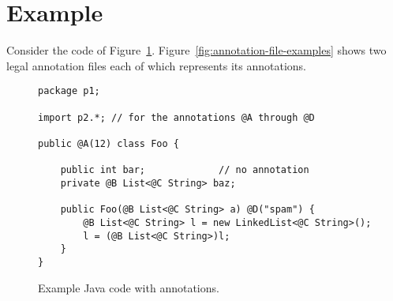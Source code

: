 \documentclass{article}
\begin{document}
\section{Example}
\label{sec:example}

Consider the code of Figure~\ref{fig:java-example}.
Figure~\ref{fig:annotation-file-examples} shows two legal annotation files
each of which represents its annotations.


\begin{figure}
\begin{verbatim}
package p1;

import p2.*; // for the annotations @A through @D

public @A(12) class Foo {

    public int bar;             // no annotation
    private @B List<@C String> baz;

    public Foo(@B List<@C String> a) @D("spam") {
        @B List<@C String> l = new LinkedList<@C String>();
        l = (@B List<@C String>)l;
    }
}
\end{verbatim}
\caption{Example Java code with annotations.}
\label{fig:java-example}
\end{figure}
\end{document}

